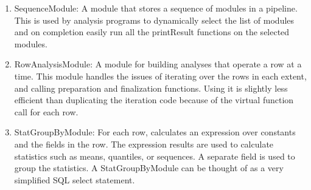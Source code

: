 \begin{enumerate}
  \item SequenceModule: A module that stores a sequence of modules in
a pipeline.  This is used by analysis programs to dynamically
select the list of modules and on completion easily run all the printResult
functions on the selected modules.

  \item RowAnalysisModule: A module for building analyses that operate
a row at a time.  This module handles the issues of iterating over the
rows in each extent, and calling preparation and finalization
functions.  Using it is slightly less efficient than duplicating the
iteration code because of the virtual function call for each row.

  \item \DS{}StatGroupByModule: For each row, calculates an expression over
constants and the fields in the row.  The expression results are used to
calculate statistics such as means, quantiles, or sequences.  A separate 
field is used to group the statistics.  A \DS{}StatGroupByModule can be thought of as a very 
simplified SQL select statement.

\end{enumerate}


